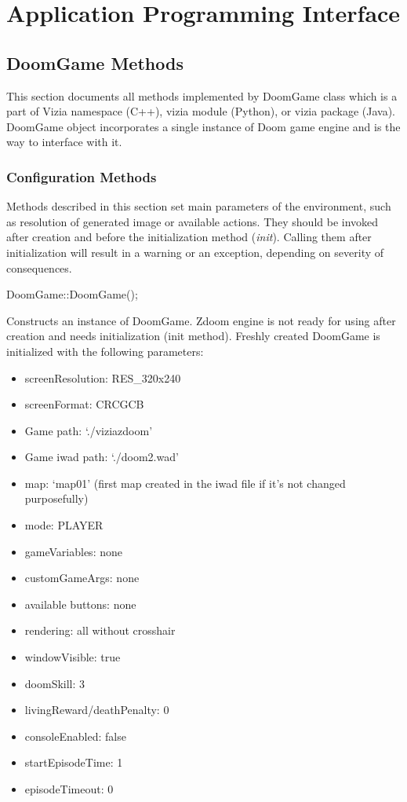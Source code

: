 \chapter{Application Programming Interface}\label{ch:api}
\section{DoomGame Methods}\label{sec:methods}
	This section documents all methods implemented by DoomGame class which is a part of Vizia namespace (C++), vizia module (Python), or vizia package (Java). DoomGame object incorporates a single instance of Doom game engine and is the way to interface with it.
	\subsection{Configuration Methods}\label{subsec:config_methods}
	Methods described in this section set main parameters of the environment, such as resolution of generated image or available actions. They should be invoked after creation and before the initialization method (\emph{init}). Calling them after initialization will result in a warning or an exception, depending on severity of consequences. 
	\vspace{20pt}

\begin{clinee}
DoomGame::DoomGame();
\end{clinee}

	Constructs an instance of DoomGame. Zdoom engine is not ready for using after creation and needs initialization (init method). Freshly created DoomGame is initialized with the following parameters:
	\begin{itemize}
		\item screenResolution: RES\_320x240
		\item screenFormat: CRCGCB
		\item Game path: `./viziazdoom'
		\item Game iwad path: `./doom2.wad'
		\item map: `map01' (first map created in the iwad file if it's not changed purposefully)
		\item mode: PLAYER
		\item gameVariables: none
		\item customGameArgs: none
		\item available buttons: none
		\item rendering: all without crosshair
		\item windowVisible: true 
		\item doomSkill: 3
		\item livingReward/deathPenalty: 0
		\item consoleEnabled: false
		\item startEpisodeTime: 1
		\item episodeTimeout: 0
	\end{itemize}

